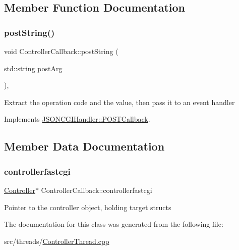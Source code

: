 \subsection{Member Function Documentation}
\mbox{\label{classControllerCallback_aa7aa4c4c12ced1395e8c40ed1b82db12}} 
\subsubsection{\texorpdfstring{post\+String()}{postString()}}
{\footnotesize\ttfamily void Controller\+Callback\+::post\+String (\begin{DoxyParamCaption}\item[{std\+::string}]{post\+Arg }\end{DoxyParamCaption})\hspace{0.3cm}{\ttfamily [inline]}, {\ttfamily [virtual]}}

Extract the operation code and the value, then pass it to an event handler 

Implements \hyperlink{classJSONCGIHandler_1_1POSTCallback_a6cddb384a3fd9242b323cea3d82a6bb7}{J\+S\+O\+N\+C\+G\+I\+Handler\+::\+P\+O\+S\+T\+Callback}.



\subsection{Member Data Documentation}
\mbox{\label{classControllerCallback_a0992380f69e00cdb841e291d3d447cd5}} 
\subsubsection{\texorpdfstring{controllerfastcgi}{controllerfastcgi}}
{\footnotesize\ttfamily \hyperlink{classController}{Controller}$\ast$ Controller\+Callback\+::controllerfastcgi}

Pointer to the controller object, holding target structs 

The documentation for this class was generated from the following file\+:\begin{DoxyCompactItemize}
\item 
src/threads/\hyperlink{ControllerThread_8cpp}{Controller\+Thread.\+cpp}\end{DoxyCompactItemize}
